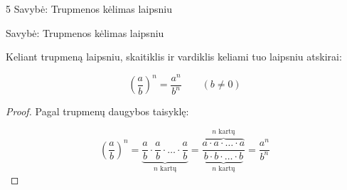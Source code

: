 \documentclass[aspectratio=169,10pt]{beamer}
\newenvironment{property}[1][]%
{\begin{block}{Savybė: #1}}%
{\end{block}}
\begin{document}
\begin{frame}{5 Savybė: Trupmenos kėlimas laipsniu}

    \begin{property}[Trupmenos kėlimas laipsniu]

        Keliant trupmeną laipsniu, skaitiklis ir vardiklis
        keliami tuo laipsniu atskirai:

        \[
        \left(\frac{a}{b}\right)^n
        =
        \frac{a^n}{b^n}
        \qquad (b\neq0)
        \]

    \end{property}

    \begin{proof}

        Pagal trupmenų daugybos taisyklę:

        \[
        \left(\frac{a}{b}\right)^n
        =
        \underbrace{
        \frac{a}{b}\cdot
        \frac{a}{b}\cdot
        \dots\cdot
        \frac{a}{b}
        }_{n\text{ kartų}}
        =
        \frac{
        \overbrace{
        a\cdot a\cdot\dots\cdot a
        }^{n\text{ kartų}}
        }{
        \underbrace{
        b\cdot b\cdot\dots\cdot b
        }_{n\text{ kartų}}
        }
        =
        \frac{a^n}{b^n}
        \]

    \end{proof}

\end{frame}
\end{document}
